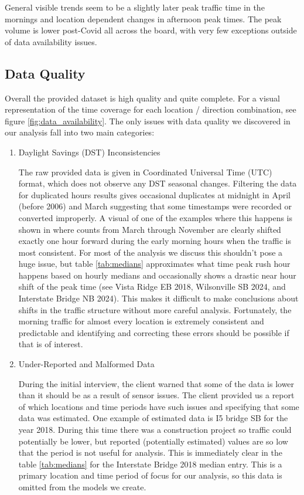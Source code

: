 \documentclass{article}
\begin{document}
General visible trends seem to be a slightly later peak traffic time in the mornings and location dependent changes in afternoon peak times. The peak volume is lower post-Covid all across the board, with very few exceptions outside of data availability issues. 

\subsection{Data Quality}
Overall the provided dataset is high quality and quite complete. For a visual representation of the time coverage for each location / direction combination, see figure \ref{fig:data_availability}. The only issues with data quality we discovered in our analysis fall into two main categories:

\begin{enumerate}
    \item Daylight Savings (DST) Inconsistencies 

        The raw provided data is given in Coordinated Universal Time (UTC) format, which does not observe any DST seasonal changes. Filtering the data for duplicated hours results gives occasional duplicates at midnight in April (before 2006) and March suggesting that some timestamps were recorded or converted improperly. A visual of one of the examples where this happens is shown in 
        where counts from March through November are clearly shifted exactly one hour forward during the early morning hours when the traffic is most consistent. For most of the analysis we discuss this shouldn't pose a huge issue, but table \ref{tab:medians} approximates what time peak rush hour happens based on hourly medians and occasionally shows a drastic near hour shift of the peak time (see Vista Ridge EB 2018, Wilsonville SB 2024, and Interstate Bridge NB 2024). This makes it difficult to make conclusions about shifts in the traffic structure without more careful analysis. Fortunately, the morning traffic for almost every location is extremely consistent and predictable and identifying and correcting these errors should be possible if that is of interest. 

    \item Under-Reported and Malformed Data

        During the initial interview, the client warned that some of the data is lower than it should be as a result of sensor issues. The client provided us a report of which locations and time periods have such issues and specifying that some data was estimated. One example of estimated data is I5 bridge SB for the year 2018. During this time there was a construction project so traffic could potentially be lower, but reported (potentially estimated) values are so low that the period is not useful for analysis. This is immediately clear in the table \ref{tab:medians} for the Interstate Bridge 2018 median entry. This is a primary location and time period of focus for our analysis, so this data is omitted from the models we create. 


\end{enumerate}
\end{document}
